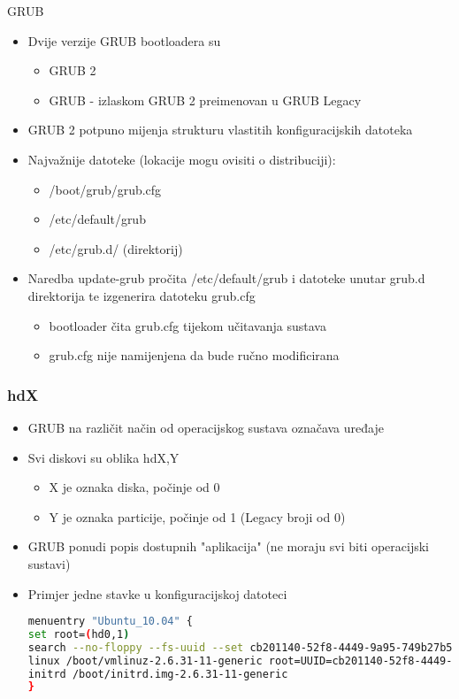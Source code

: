 \documentclass[croatian,t]{beamer} %
\begin{document}
	\begin{frame}{GRUB}
		\begin{itemize}
			\item Dvije verzije GRUB bootloadera su
			\begin{itemize}
				\item GRUB 2
				\item GRUB - izlaskom GRUB 2 preimenovan u GRUB Legacy
			\end{itemize}
			\item GRUB 2 potpuno mijenja strukturu vlastitih konfiguracijskih datoteka
			\item Najvažnije datoteke (lokacije mogu ovisiti o distribuciji):
			\begin{itemize}
				\item /boot/grub/grub.cfg
				\item /etc/default/grub
				\item /etc/grub.d/ (direktorij)
			\end{itemize}
			\item Naredba update-grub pročita /etc/default/grub i datoteke unutar grub.d direktorija te izgenerira datoteku grub.cfg
			\begin{itemize}
				\item bootloader čita grub.cfg tijekom učitavanja sustava
				\item grub.cfg nije namijenjena da bude ručno modificirana
			\end{itemize}
		\end{itemize}
	\end{frame}
	
	\begin{frame}[fragile]
	\frametitle{hdX}
		\begin{itemize}
			\item GRUB na različit način od operacijskog sustava označava uređaje
			\item Svi diskovi su oblika hdX,Y
			\begin{itemize}
				\item X je oznaka diska, počinje od 0
				\item Y je oznaka particije, počinje od 1 (Legacy broji od 0)
			\end{itemize}
			\item GRUB ponudi popis dostupnih "aplikacija" (ne moraju svi biti operacijski sustavi)
			\item Primjer jedne stavke u konfiguracijskoj datoteci
			\begin{lstlisting}[basicstyle={\scriptsize\ttfamily},language=bash]
menuentry "Ubuntu_10.04" {
set root=(hd0,1)
search --no-floppy --fs-uuid --set cb201140-52f8-4449-9a95-749b27b58ce8
linux /boot/vmlinuz-2.6.31-11-generic root=UUID=cb201140-52f8-4449-9a95-749b27b58ce8 ro quiet splash
initrd /boot/initrd.img-2.6.31-11-generic
}
			\end{lstlisting}		
		\end{itemize}
	\end{frame}
	
\end{document}
